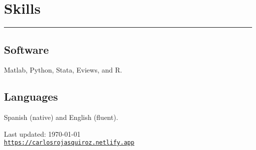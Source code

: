 \documentclass[letterpaper, Biolinum]{article}
\def\footerlink{https://carlosrojasquiroz.netlify.app}
\renewenvironment{itemize}{
  \begin{list}{}{
    \setlength{\leftmargin}{1.5em}
  }
}{
  \end{list}
}
\begin{document}
\section*{Skills}
\vspace{-0.1in}
\hrule
\vspace{0.1in}
\subsection*{Software}
\begin{itemize}
\item Matlab, Python, Stata, Eviews, and R.
\end{itemize}
\subsection*{Languages}
\begin{itemize}
\item Spanish (native) and English (fluent).
\end{itemize}

\bigskip

\begin{center}
  \begin{footnotesize}
    Last updated: \today \\
    \href{\footerlink}{\texttt{\footerlink}}
  \end{footnotesize}
\end{center}
\end{document}
